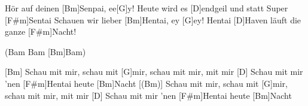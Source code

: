 \begin{guitar}
	\begin{highlightbar}
		 
		Hör auf deinen [Bm]Senpai, ee[G]y!
		Heute wird es [D]endgeil und statt Super [F#m]Sentai
		Schauen wir lieber [Bm]Hentai, ey [G]ey!
		Hentai [D]Haven läuft die ganze [F#m]Nacht!
	\end{highlightbar}
	(Bam Bam [Bm]Bam)
	
	[Bm] Schau mit mir, schau mit [G]mir, schau mit mir, mit mir
	[D] Schau mit mir 'nen [F#m]Hentai heute [Bm]Nacht
	[(Bm)] Schau mit mir, schau mit [G]mir, schau mit mir, mit mir
	[D] Schau mit mir 'nen [F#m]Hentai heute [Bm]Nacht
	
\end{guitar}
